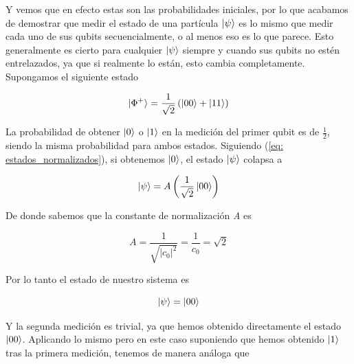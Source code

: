 \documentclass{article}
\numberwithin{equation}{section} %
\begin{document}
    \vspace{2.5mm}

    Y vemos que en efecto estas son las probabilidades iniciales, por lo que acabamos de demostrar que medir el estado de una partícula \( \ket{\psi} \) es lo mismo que medir cada uno de sus qubits secuencialmente, o al menos eso es lo que parece. Esto generalmente es cierto para cualquier \( \ket{\psi} \) siempre y cuando sus qubits no estén entrelazados, ya que si realmente lo están, esto cambia completamente. Supongamos el siguiente estado

    \begin{equation*}
        \ket{\Phi^{+}} = \frac{1}{\sqrt{2}} \left( \ket{0 0} + \ket{1 1} \right)
    \end{equation*}

    \vspace{2.5mm}

    La probabilidad de obtener \( \ket{0} \) o \( \ket{1} \) en la medición del primer qubit es de \( \frac{1}{2} \), siendo la misma probabilidad para ambos estados. Siguiendo (\ref{eq: estados_normalizados}), si obtenemos \( \ket{0} \), el estado \( \ket{\psi} \) colapsa a 

    \begin{equation*}
        \ket{\psi} = A \left( \frac{1}{\sqrt{2}} \ket{0 0} \right)
    \end{equation*}

    \vspace{2.5mm}

    De donde sabemos que la constante de normalización \textit{A} es

    \begin{equation*}
        A = \frac{1}{\sqrt{| c_{0} |^{2}}} = \frac{1}{c_{0}} = \sqrt{2}
    \end{equation*}

    \vspace{2.5mm}

    Por lo tanto el estado de nuestro sistema es

    \begin{equation*}
        \ket{\psi} = \ket{0 0}
    \end{equation*}

    \vspace{2.5mm}

    Y la segunda medición es trivial, ya que hemos obtenido directamente el estado \( \ket{0 0} \). Aplicando lo mismo pero en este caso suponiendo que hemos obtenido \( \ket{1} \) tras la primera medición, tenemos de manera análoga que
\end{document}
